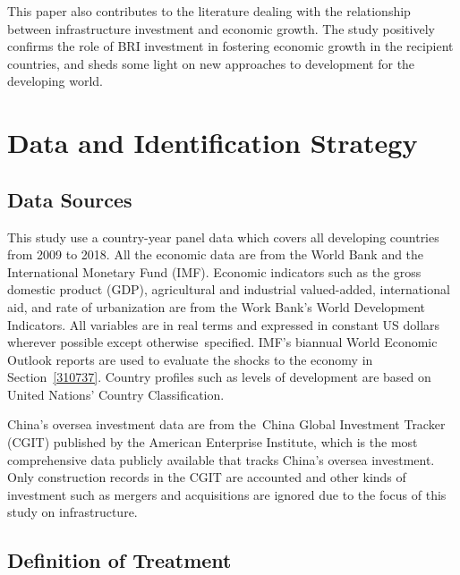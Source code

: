 \documentclass[10pt,a4paper]{article}
\begin{document}
This paper also contributes to the literature dealing with the
relationship between infrastructure investment and economic growth. The
study positively confirms the role of BRI investment in fostering
economic growth in the recipient countries, and sheds some light on new
approaches to development for the developing world.~

\par\null

\section{Data and Identification
Strategy}

{\label{436643}}

\subsection{Data Sources}

{\label{515505}}

This study use a country-year panel data which covers all developing
countries from 2009 to 2018. All the economic data are from the World
Bank and the International Monetary Fund (IMF). Economic indicators such
as the gross domestic product (GDP), agricultural and industrial
valued-added, international aid, and rate of urbanization are from the
Work Bank's World Development Indicators. All variables are in real
terms and expressed in constant US dollars wherever possible except
otherwise~specified. IMF's biannual World Economic Outlook reports are
used to evaluate the shocks to the economy in
Section~{\ref{310737}}. Country profiles such as levels
of development are based on United Nations' Country Classification.~

China's oversea investment data are from the~China Global Investment
Tracker (CGIT) published by the American Enterprise Institute, which is
the most comprehensive data publicly available that tracks China's
oversea investment. Only construction records in the CGIT are accounted
and other kinds of investment such as mergers and acquisitions are
ignored due to the focus of this study on infrastructure.

\par\null

\subsection{Definition of Treatment}

{\label{387102}}
\end{document}
